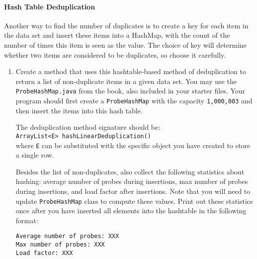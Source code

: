 \documentclass[12pt]{article}
\begin{document}
\paragraph{Hash Table Deduplication}
Another way to find the number of duplicates is to create a key for each item in the data set and insert these items into a HashMap, with the count of the number of times this item is seen as the value. The choice of key will determine whether two items are considered to be duplicates, so choose it carefully.

%
%
%

\begin{enumerate}[start=2]
\item Create a method that uses this hashtable-based method of deduplication to return a list of non-duplicate items in a given data set. You may use the \verb+ProbeHashMap.java+ from the book, also included in your starter files. Your program should first create a \verb+ProbeHashMap+ with the capacity \verb+1,000,003+ and then insert the items into this hash table. 

The deduplication method signature should be:\\
\verb+ArrayList<E> hashLinearDeduplication()+\\
where \verb+E+ can be substituted with the specific object you have created to store a single row. 

Besides the list of non-duplicates, also collect the following statistics about hashing: average number of probes during insertions, max number of probes during insertions, and load factor after insertions. Note that you will need to update \verb+ProbeHashMap+ class to compute these values. Print out these statistics once after you have inserted all elements into the hashtable in the following format:
\begin{verbatim}
Average number of probes: XXX
Max number of probes: XXX
Load factor: XXX
\end{verbatim}

\end{enumerate}
\end{document}
